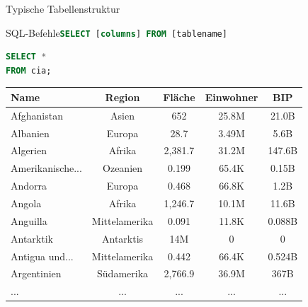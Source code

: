 \begin{frame}[fragile]{Typische Tabellenstruktur}
\end{frame}

\begin{frame}[fragile]{SQL-Befehle}{\lstinline[language=SQL]|SELECT [columns] FROM [tablename]|}
\begin{lstlisting}[language=SQL, basicstyle=\ttfamily\scriptsize]
SELECT *
FROM cia;
\end{lstlisting}

\begin{table}
  \centering
  \tiny
  \begin{tabular}{lcccc}
    \toprule
    \textbf{Name} & \textbf{Region} & \textbf{Fläche} & \textbf{Einwohner} & \textbf{BIP} \\
    \midrule
    Afghanistan & Asien & 652 & 25.8M & 21.0B \\
    Albanien & Europa & 28.7 & 3.49M & 5.6B \\
    Algerien & Afrika & 2,381.7 & 31.2M & 147.6B \\
    Amerikanische... & Ozeanien & 0.199 & 65.4K & 0.15B \\
    Andorra & Europa & 0.468 & 66.8K & 1.2B \\
    Angola & Afrika & 1,246.7 & 10.1M & 11.6B \\
    Anguilla & Mittelamerika & 0.091 & 11.8K & 0.088B \\
    Antarktik & Antarktis & 14M & 0 & 0 \\
    Antigua und... & Mittelamerika & 0.442 & 66.4K & 0.524B \\
    Argentinien & Südamerika & 2,766.9 & 36.9M & 367B \\
    \midrule
    ... & ... & ... & ... & ... \\
    \bottomrule
  \end{tabular}
\end{table}
\end{frame}

